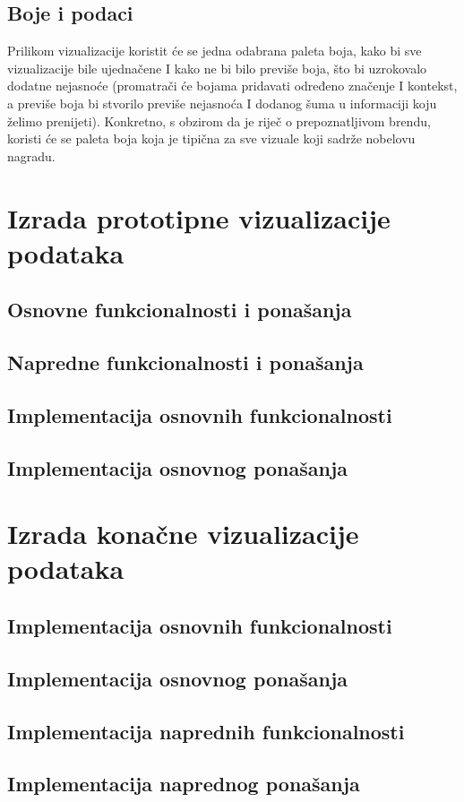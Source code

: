 \documentclass[12pt]{article}
\numberwithin{equation}{section}
\begin{document}
\subsection{Boje i podaci}
Prilikom vizualizacije koristit će se jedna odabrana paleta boja, kako bi sve vizualizacije bile ujednačene I kako ne bi bilo previše boja, što bi uzrokovalo dodatne nejasnoće (promatrači će bojama pridavati određeno značenje I kontekst, a previše boja bi stvorilo previše nejasnoća I dodanog šuma u informaciji koju želimo prenijeti). Konkretno, s obzirom da je riječ o prepoznatljivom brendu, koristi će se paleta boja koja je tipična za sve vizuale koji sadrže nobelovu nagradu.
\newpage
\section{Izrada prototipne vizualizacije podataka}
\subsection{Osnovne funkcionalnosti i ponašanja}
\subsection{Napredne funkcionalnosti i ponašanja}
\subsection{Implementacija osnovnih funkcionalnosti}
\subsection{Implementacija osnovnog ponašanja}
\newpage
\section{Izrada konačne vizualizacije podataka}
\subsection{Implementacija osnovnih funkcionalnosti}
\subsection{Implementacija osnovnog ponašanja}
\subsection{Implementacija naprednih funkcionalnosti}
\subsection{Implementacija naprednog ponašanja}
\newpage
\printbibliography
{}
\end{document}
